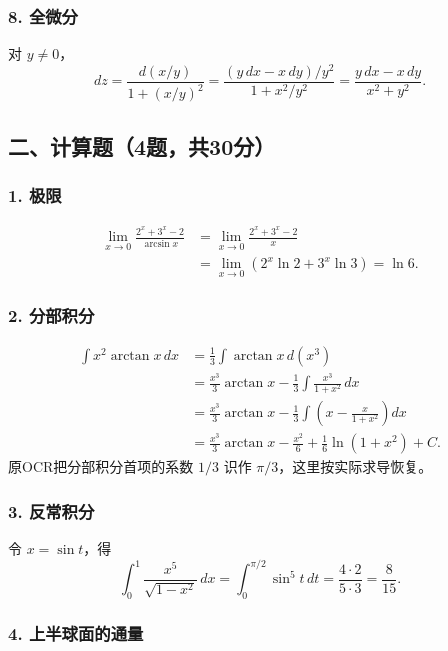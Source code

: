 \documentclass[11pt,fontset=fandol]{ctexart}
\begin{document}
\subsubsection{8. 全微分}\label{ux5168ux5faeux5206}

对 \(y\ne0\)， \[
dz=\frac{d(x/y)}{1+(x/y)^2}
=\frac{(y\,dx-x\,dy)/y^2}{1+x^2/y^2}
=\frac{y\,dx-x\,dy}{x^2+y^2}.
\]

\subsection{二、计算题（4题，共30分）}\label{ux4e8cux8ba1ux7b97ux98984ux9898ux517130ux5206}

\subsubsection{1. 极限}\label{ux6781ux9650-1}

\[
\begin{aligned}
\lim_{x\to0}\frac{2^x+3^x-2}{\arcsin x}
&=\lim_{x\to0}\frac{2^x+3^x-2}{x}\\
&=\lim_{x\to0}(2^x\ln2+3^x\ln3)=\ln6.
\end{aligned}
\]

\subsubsection{2. 分部积分}\label{ux5206ux90e8ux79efux5206}

\[
\begin{aligned}
\int x^2\arctan x\,dx
&=\frac13\int\arctan x\,d(x^3)\\
&=\frac{x^3}{3}\arctan x-\frac13\int\frac{x^3}{1+x^2}\,dx\\
&=\frac{x^3}{3}\arctan x-\frac13\int\left(x-\frac{x}{1+x^2}\right)dx\\
&=\frac{x^3}{3}\arctan x-\frac{x^2}{6}+\frac16\ln(1+x^2)+C.
\end{aligned}
\] 原OCR把分部积分首项的系数 \(1/3\) 识作
\(\pi/3\)，这里按实际求导恢复。

\subsubsection{3. 反常积分}\label{ux53cdux5e38ux79efux5206}

令 \(x=\sin t\)，得 \[
\int_0^1\frac{x^5}{\sqrt{1-x^2}}\,dx
=\int_0^{\pi/2}\sin^5t\,dt=\frac{4\cdot2}{5\cdot3}=\frac8{15}.
\]

\subsubsection{4.
上半球面的通量}\label{ux4e0aux534aux7403ux9762ux7684ux901aux91cf}
\end{document}
